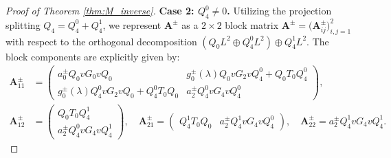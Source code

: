 \documentclass[reqno]{amsart}
\numberwithin{equation}{section}
\begin{document}
\begin{proof}[Proof of Theorem \ref{thm:M_inverse}]
\textbf{Case 2: $Q_4^0 \neq 0$.} Utilizing the projection splitting $Q_4 = Q_4^0 + Q_4^1$, we represent $\mathbf{A}^{\pm}$ as a $2 \times 2$ block matrix $\mathbf{A}^{\pm} = \bigl( \mathbf{A}_{ij}^{\pm}\bigr)_{i,j=1}^2$ with respect to the orthogonal decomposition $(Q_0 L^2 \oplus Q_4^0 L^2) \oplus Q_{4}^1 L^2$. The block components are explicitly given by:
	\begin{align}\label{Aij}
		\mathbf{A}_{11}^{\pm} &= \begin{pmatrix}
			a_0^\pm Q_0 v G_0 v Q_0 & g_0^{\pm}(\lambda) Q_0 v G_2 v Q_4^0 + Q_0 T_0 Q_4^0 \\[6pt]
			g_0^{\pm}(\lambda) Q_4^0 v G_2 v Q_0 + Q_4^0 T_0 Q_0 & a_2^\pm Q_4^0 v G_4 v Q_4^0
		\end{pmatrix}, \nonumber\\[8pt]
		\mathbf{A}_{12}^{\pm} &= \begin{pmatrix} Q_0 T_0 Q_{4}^1  \\ a_2^\pm Q_4^0 v G_4 v Q_{4}^1 \end{pmatrix}, \quad
		\mathbf{A}_{21}^{\pm} = \begin{pmatrix} Q_{4}^1 T_0 Q_0 & a_2^\pm Q_4^1 v G_4 v Q_4^0 \end{pmatrix}, \quad
		\mathbf{A}_{22}^{\pm} = a_2^\pm Q_4^1 v G_4 v Q_4^1.
	\end{align}
	

\end{proof}
\end{document}
